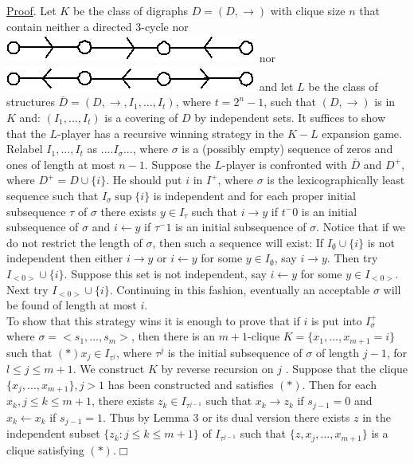 \documentclass[twoside]{article}
\begin{document}
\underline{Proof}.    Let   $K$   be the class of digraphs   $D = (D,\rightarrow)$   with clique size   $n$ that contain neither a directed 3-cycle nor \includegraphics[scale=0.25]{figures/small/1.png}   nor \includegraphics[scale=0.25]{figures/small/2.png} and let   $L$   be the class of structures   $\bar{D} = (D,\rightarrow,I_1,...,I_t)$, where   $t = 2^n - 1$, such that    $(D,\rightarrow)$    is in   $K$   and:  $(I_1,...,I_t)$    is a covering of   $D$ by independent sets.    
It suffices to show that the   $L$-player has a recursive winning strategy in the   $K-L$   expansion game.   
Relabel   $I_1,...,I_t$ as $....I_\sigma...$, where $\sigma$   is a (possibly empty) sequence of zeros and ones of length at most   $n-1$.    Suppose the   $L$-player is confronted with  $\bar{D}$   and   $D^+$, where   $D^+ = D\cup \{i\}$.    
He   should put   $i$   in   $I^+$, where  $\sigma$   is the lexicographically least sequence such that   $I_\sigma \sup \{i\}$ is independent and for each proper initial subsequence  $\tau$   of $\sigma$   there exists   $y\in I_\tau$   such that $i\rightarrow y$ if   $t^-0$   is an initial subsequence of $\sigma$   and   $i\leftarrow y$   if   $\tau^-1$   is an initial subsequence of   $\sigma$. 
Notice that if we do not restrict the length of $\sigma$, then such a sequence will exist: If $I_\emptyset \cup \{i\}$ is not independent then either $i \rightarrow y$ or $i \leftarrow y$ for some $y \in I_\emptyset$, say $i \rightarrow y$. Then try $I_{<0>} \cup \{i\}$. 
Suppose this set is not independent, say $i \leftarrow y$ for some $y \in I_{<0>}$. Next try
$I_{<0>} \cup \{i\}$. Continuing in this fashion, eventually an acceptable $\sigma$ will be found of length at most $i$.\\
\indent To show that this strategy wins it is enough to prove that if   $i$   is put
into   $I_\sigma^+$   where   $\sigma = <s_1,...,s_m>$, then there is an $m+1$-clique
$K=\{x_1,...,x_{m+1}=i\}$ such that $(*) x_j \in I_{\tau^j}$, where $\tau^j$ is the initial subsequence
of  $\sigma$  of length $j-1$, for   $l\leq j\leq m+1$.   We construct   $K$   by reverse recursion on
$j$ .    Suppose that the clique $\{x_j,...,x_{m+1}\}, j>1$ has been constructed and
satisfies $(*)$.   Then for each   $x_k, j\leq k\leq m+1$, there exists   $z_k\in I_{\tau^{j-1}}$   such that
$x_k \rightarrow z_k$ if   $s_{j-1}=0$   and  $x_k \leftarrow x_k$	if $s_{j-1} = 1$.   Thus by Lemma 3 or its dual
version there exists   $z$   in the independent subset $\{z_k:j\leq k \leq m+1\}$   of $I_{\tau^{j-1}}$ such that $\{z,x_j,...,x_{m+1}\}$    is a clique satisfying $(*)$.$\Box$\\
\end{document}
